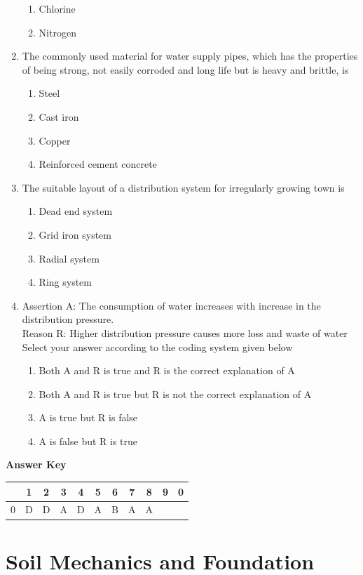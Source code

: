 \documentclass[11pt,a4paper]{article}
\begin{document}
\begin{enumerate}
\begin{enumerate}[label=\Alph*.]
\item{Chlorine}
\item{Nitrogen}
\end{enumerate}
\item{The commonly used material for water supply pipes, which has the properties of being strong, not easily corroded and long life but is heavy and brittle, is}
\begin{enumerate}[label=\Alph*.]
\item{Steel}
\item{Cast iron}
\item{Copper}
\item{Reinforced cement concrete}
\end{enumerate}
\item{The suitable layout of a distribution system for irregularly growing town is}
\begin{enumerate}[label=\Alph*.]
\item{Dead end system}
\item{Grid iron system}
\item{Radial system}
\item{Ring system}
\end{enumerate}
\item{Assertion A: The consumption of water increases with increase in the distribution pressure. \\
Reason R: Higher distribution pressure causes more loss and waste of water \\
Select your answer according to the coding system given below}
\begin{enumerate}[label=\Alph*.]
\item{Both A and R is true and R is the correct explanation of A}
\item{Both A and R is true but R is not the correct explanation of A}
\item{A is true but R is false}
\item{A is false but R is true}
\end{enumerate}
\end{enumerate}
\textbf{Answer Key}
\begin{tabular}{ | c | c c c c c c c c c c | }
\hline
 & 1 & 2 & 3 & 4 & 5 & 6 & 7 & 8 & 9 & 0 \\
\hline
0 & D & D & A & D & A & B & A & A &   &   \\
\hline
\end{tabular}
\clearpage
\section{Soil Mechanics and Foundation}
\end{document}
